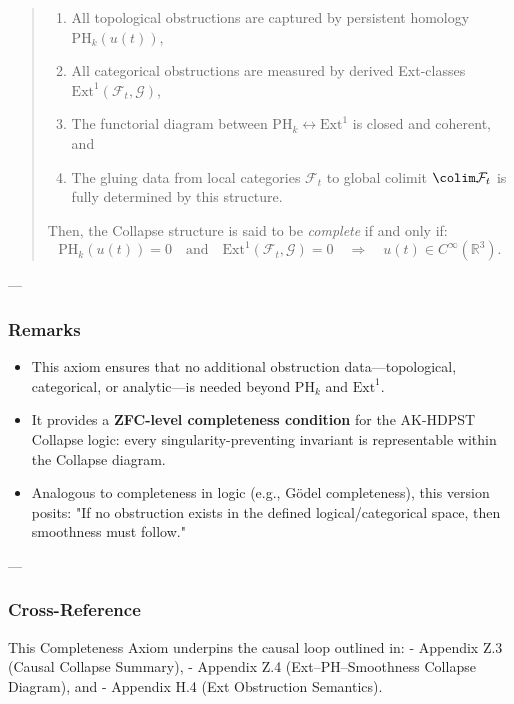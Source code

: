 \documentclass[11pt]{article}
\begin{document}
\begin{axiom}
\begin{axiom}
{{\begin{quote}
\begin{enumerate}
  \item All topological obstructions are captured by persistent homology \(\mathrm{PH}_k(u(t))\),
  \item All categorical obstructions are measured by derived Ext-classes \(\mathrm{Ext}^1(\mathcal{F}_t, \mathcal{G})\),
  \item The functorial diagram between \(\mathrm{PH}_k \leftrightarrow \mathrm{Ext}^1\) is closed and coherent, and
  \item The gluing data from local categories \(\mathcal{F}_t\) to global colimit \(\colim \mathcal{F}_t\) is fully determined by this structure.
\end{enumerate}

Then, the Collapse structure is said to be \emph{complete} if and only if:
\[
\mathrm{PH}_k(u(t)) = 0 \quad \text{and} \quad \mathrm{Ext}^1(\mathcal{F}_t, \mathcal{G}) = 0 \quad \Longrightarrow \quad u(t) \in C^\infty(\mathbb{R}^3).
\]
\end{quote}

---

\subsubsection*{Remarks}

\begin{itemize}
  \item This axiom ensures that no additional obstruction data—topological, categorical, or analytic—is needed beyond \(\mathrm{PH}_k\) and \(\mathrm{Ext}^1\).
  \item It provides a \textbf{ZFC-level completeness condition} for the AK-HDPST Collapse logic:  
  every singularity-preventing invariant is representable within the Collapse diagram.
  \item Analogous to completeness in logic (e.g., Gödel completeness), this version posits:  
  "If no obstruction exists in the defined logical/categorical space, then smoothness must follow."
\end{itemize}

---

\subsubsection*{Cross-Reference}

This Completeness Axiom underpins the causal loop outlined in:
- Appendix Z.3 (Causal Collapse Summary),
- Appendix Z.4 (Ext–PH–Smoothness Collapse Diagram), and
- Appendix H.4 (Ext Obstruction Semantics).

}}
\end{axiom}
\end{axiom}
\end{document}
